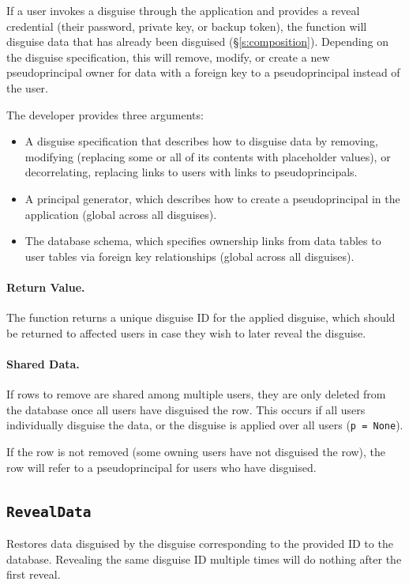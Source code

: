     If a user invokes a disguise through the application and provides a reveal
    credential (their password, private key, or backup token), the function will
    disguise data that has already been disguised (\S\ref{s:composition}).
    Depending on the disguise specification, this will remove, modify, or create
    a new pseudoprincipal owner for data with a foreign key to a pseudoprincipal
    instead of the user.

    The developer provides three arguments:
    \begin{itemize}[nosep]
    \item A disguise specification that describes how to disguise data by
    removing, modifying (replacing some or all of its contents with placeholder
    values), or decorrelating, replacing links to users with links to
    pseudoprincipals.
    
    \item A principal generator, which describes how to create a
    pseudoprincipal in the application (global across all disguises).
    
    \item The database schema, which specifies ownership links from data tables to user
    tables via foreign key relationships (global across all disguises).
    \end{itemize}

    \paragraph{Return Value.} 
    The function returns a unique disguise ID for the applied disguise, which
    should be returned to affected users in case they wish to later reveal the
    disguise.

    \paragraph{Shared Data.}
    If rows to remove are shared among multiple users, they are only deleted
    from the database once all users have disguised the row. This occurs if
    \one{} all users individually disguise the data, or \two{} the disguise is
    applied over all users (\texttt{p = None}).
   
    If the row is not removed (some owning users have not disguised the row),
    the row will refer to a pseudoprincipal for users who have disguised.

\subsection{\texttt{RevealData}}
    Restores data disguised by the disguise corresponding to the provided ID to
    the database. Revealing the same disguise ID multiple times will do nothing
    after the first reveal.

